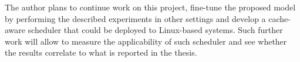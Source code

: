 The author plans to continue work on this project, fine-tune the proposed model by performing the described experiments in other settings and develop a cache-aware scheduler that could be deployed to Linux-based systems. Such further work will allow to measure the applicability of such scheduler and see whether the results correlate to what is reported in the thesis.

